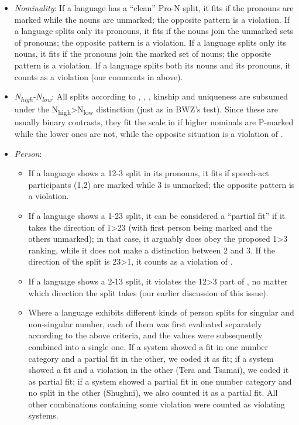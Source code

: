 \documentclass[output=paper]{langscibook}
\begin{document}
\begin{itemize}
\item \textit{Nominality}: 
If a language has a “clean” Pro-N split, it fits  if the pronouns are marked while the nouns are unmarked; the opposite pattern is a violation. If a language splits only its pronouns, it fits  if the nouns join the unmarked sets of pronouns; the opposite pattern is a violation. If a language splits only its nouns, it fits  if the pronouns join the marked set of nouns; the opposite pattern is a violation. If a language splits both its nouns and its pronouns, it counts as a violation (\cf our comments in  above).

\item 
\textit{N\textsubscript{high}}\textit{{}-N}\textit{\textsubscript{low}}: All splits according to , , , kinship and uniqueness are subsumed under the N\textsubscript{high}>N\textsubscript{low} distinction (just as in BWZ’s test). Since these are usually binary contrasts, they fit the scale in  if higher nominals are P-marked while the lower ones are not, while the opposite situation is a violation of .

\item 
\textit{Person}:

\begin{itemize}
\item If a language shows a 12-3 split in its pronouns, it fits  if speech-act participants (1,2) are marked while 3 is unmarked; the opposite pattern is a violation.

\item If a language shows a 1-23 split, it can be considered a “partial fit” if it takes the direction of 1>23 (\ie with first person being marked and the others unmarked); in that case, it arguably does obey the proposed 1>3 ranking, while it does not make a distinction between 2 and 3. If the direction of the split is 23>1, it counts as a violation of . 

\item If a language shows a 2-13 split, it violates the 12>3 part of , no matter which direction the split takes (\cf our earlier discussion of this issue).

\item Where a language exhibits different kinds of person splits for singular and non-singular number, each of them was first evaluated separately according to the above criteria, and the values were subsequently combined into a single one. If a system showed a fit in one number category and a partial fit in the other, we coded it as fit; if a system showed a fit and a violation in the other (\eg Tera and Tsamai), we coded it as partial fit; if a system showed a partial fit in one number category and no split in the other (\eg Shughni), we also counted it as a partial fit. All other combinations containing some violation were counted as violating systems.
\end{itemize}


\end{itemize}
\end{document}
